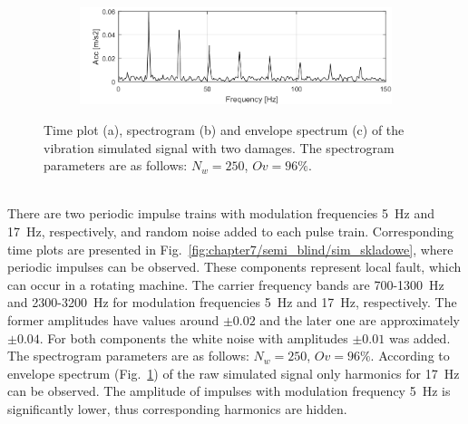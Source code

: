 \begin{figure}[!ht]
\begin{subfigure}[b]{0.7\textwidth}
    \end{subfigure}
    \begin{subfigure}[b]{0.8\textwidth}
        \centering
        \captionsetup{skip=0.01pt}
        \caption{}
        \includegraphics[width=\textwidth]{wykresy/chapter_application/semi_blind/widmo_obwiedni_simulated.png}
        \label{fig:chapter7/semi_blind/obwiednia_sim}
    \end{subfigure}
    \caption{Time plot (a), spectrogram (b) and envelope spectrum (c) of the vibration simulated signal with two damages. The spectrogram parameters are as follows: $N_w=250$, $Ov=96\%$.}
    \label{fig:chapter7/semi_blind/time-plot_sim}
\end{figure}
\\
There are two periodic impulse trains with modulation frequencies 5~Hz and 17~Hz, respectively, and random noise added to each pulse train. Corresponding time plots are presented in Fig.~\ref{fig:chapter7/semi_blind/sim_skladowe}, where periodic impulses can be observed. These components represent local fault, which can occur in a rotating machine. The carrier frequency bands are 700-1300~Hz and 2300-3200~Hz for modulation frequencies 5~Hz and 17~Hz, respectively. The former amplitudes have values around $\pm 0.02$ and the later one are approximately $\pm 0.04$. For both components the white noise with amplitudes $\pm 0.01$ was added. The spectrogram parameters are as follows: $N_w=250$, $Ov=96\%$. According to envelope spectrum (Fig.~\ref{fig:chapter7/semi_blind/obwiednia_sim}) of the raw simulated signal only harmonics for 17~Hz can be observed. The amplitude of impulses with modulation frequency 5~Hz is significantly lower, thus corresponding harmonics are hidden.

